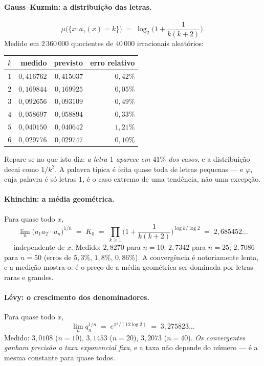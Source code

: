 \documentclass[11pt,a4paper]{article}
\theoremstyle{plain}
\theoremstyle{definition}
\theoremstyle{remark}
\begin{document}
\paragraph{Gauss--Kuzmin: a distribuição das letras.}
\[
  \mu\big(\{x : a_1(x) = k\}\big) \;=\; \log_2\!\Big(1 + \frac{1}{k(k+2)}\Big) .
\]
Medido em $2\,360\,000$ quocientes de $40\,000$ irracionais aleatórios:

\begin{center}\small
\begin{tabular}{rrrr}
\hline
$k$ & medido & previsto & erro relativo \\ \hline
$1$ & $0{,}416762$ & $0{,}415037$ & $0{,}42\%$ \\
$2$ & $0{,}169844$ & $0{,}169925$ & $0{,}05\%$ \\
$3$ & $0{,}092656$ & $0{,}093109$ & $0{,}49\%$ \\
$4$ & $0{,}058697$ & $0{,}058894$ & $0{,}33\%$ \\
$5$ & $0{,}040150$ & $0{,}040642$ & $1{,}21\%$ \\
$6$ & $0{,}029776$ & $0{,}029747$ & $0{,}10\%$ \\
\hline
\end{tabular}
\end{center}

\noindent Repare-se no que isto diz: \emph{a letra $1$ aparece em $41\%$ dos casos}, e a
distribuição decai como $1/k^2$. A palavra típica é feita quase toda de letras pequenas --- e
$\varphi$, cuja palavra é só letras $1$, é o caso extremo de uma tendência, não uma excepção.

\paragraph{Khinchin: a média geométrica.} Para quase todo $x$,
\[
  \lim_n \big(a_1a_2\cdots a_n\big)^{1/n} \;=\; K_0 \;=\; \prod_{k\geq1}
  \Big(1+\frac{1}{k(k+2)}\Big)^{\log k/\log 2} \;=\; 2{,}685452\ldots
\]
--- independente de $x$. Medido: $2{,}8270$ para $n=10$; $2{,}7342$ para $n=25$; $2{,}7086$ para
$n=50$ (erros de $5{,}3\%$, $1{,}8\%$, $0{,}86\%$). A convergência é notoriamente lenta, e a
medição mostra-o: é o preço de a média geométrica ser dominada por letras raras e grandes.

\paragraph{Lévy: o crescimento dos denominadores.} Para quase todo $x$,
\[
  \lim_n q_n^{1/n} \;=\; e^{\pi^2/(12\log 2)} \;=\; 3{,}275823\ldots
\]
Medido: $3{,}0108$ ($n=10$), $3{,}1453$ ($n=20$), $3{,}2073$ ($n=40$). \emph{Os convergentes ganham
precisão a taxa exponencial fixa}, e a taxa não depende do número --- é a mesma constante para quase
todos.
\end{document}
